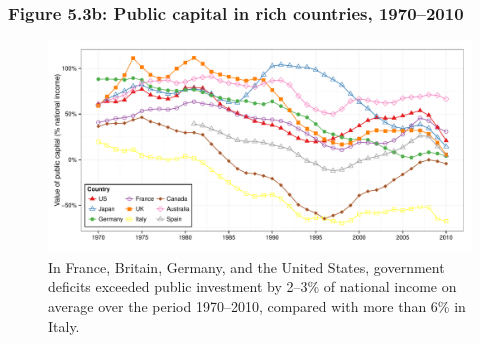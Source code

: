 \documentclass[t]{beamer}\usepackage[]{graphicx}\usepackage[]{color}
\newenvironment{knitrout}{}{} %
\begin{document}
\begin{frame}[label=Figure55a]
\frametitle{Figure 5.3b: Public capital in rich countries, 1970--2010}
\begin{figure}[t]
\begin{minipage}[b]{\textwidth}
\centering
\begin{knitrout}\footnotesize
{}\color{fgcolor}

{\centering \includegraphics[width=1\linewidth]{figures/color/Figure_5_3b} 

}



\end{knitrout}
\caption{In France, Britain, Germany, and the United States, government deficits exceeded public investment by 2--3\% of national income on average over the period 1970--2010, compared with more than 6\% in Italy.}
\end{minipage}
\end{figure}
\end{frame}
\end{document}
